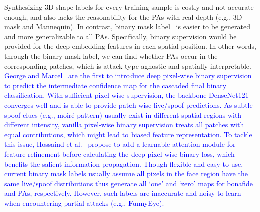 \documentclass[10pt,journal,compsoc]{IEEEtran}
\begin{document}




Synthesizing 3D shape labels for every training sample is costly and not accurate enough, and also lacks the reasonability for the PAs with real depth (e.g., 3D mask and Mannequin). In contrast, binary mask label~\cite{liu2019deep,george2019deep,hossaindeeppixbis,yu2020auto2,liu2020disentangling} is easier to be generated and more generalizable to all PAs. Specifically, binary supervision would be provided for the deep embedding features in each spatial position. In other words, through the binary mask label, we can find whether PAs occur in the corresponding patches, which is attack-type-agnostic and spatially interpretable. \textcolor{blue}{George and Marcel~\cite{george2019deep} are the first to introduce deep pixel-wise binary supervision to predict the intermediate confidence map for the cascaded final binary classification. With sufficient pixel-wise supervision, the backbone DenseNet121 converges well and is able to provide patch-wise live/spoof predictions. As subtle spoof clues (e.g., moiré pattern) usually exist in different spatial regions with different intensity, vanilla pixel-wise binary supervision treats all patches with equal contributions, which might lead to biased feature representation. To tackle this issue, Hossaind et al.~\cite{hossaindeeppixbis} propose to add a learnable attention module for feature refinement before calculating the deep pixel-wise binary loss, which benefits the salient information propagation. Though flexible and easy to use, current binary mask labels usually assume all pixels in the face region have the same live/spoof distributions thus generate all `one' and `zero' maps for bonafide and PAs, respectively. However, such labels are inaccurate and noisy to learn when encountering partial attacks (e.g., FunnyEye).} 


\end{document}
